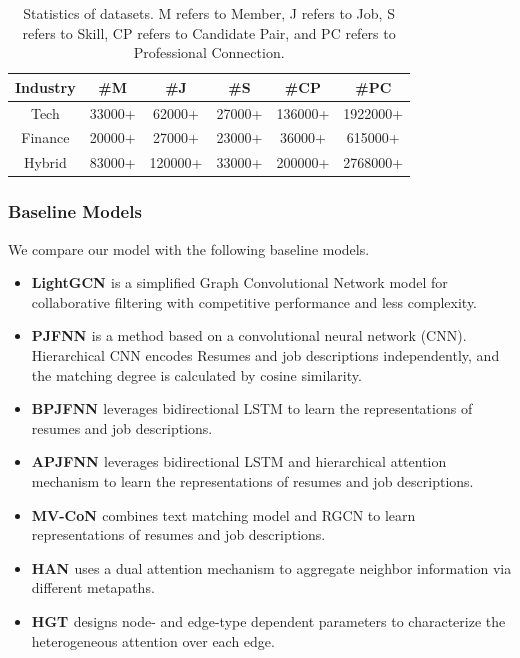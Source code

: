 \begin{table}[ht]
  \caption{Statistics of datasets. M refers to Member, J refers to Job, S refers to Skill, CP refers to Candidate Pair, and PC refers to Professional Connection.}
  \label{tab:dataset statistic}
  \begin{tabular}{cccccc}
    \toprule
    \textbf{Industry} & \textbf{\#M} & \textbf{\#J} & \textbf{\#S} & \textbf{\#CP} &\textbf{\#PC}\\
    \midrule
    Tech        &       33000+   &       62000+ &  27000+ &   136000+  &   1922000+       \\
    Finance     &       20000+   &       27000+    & 23000+ & 36000+  &   615000+       \\
    Hybrid         &       83000+   &       120000+  & 33000+  &   200000+  &   2768000+       \\
    \bottomrule
  \end{tabular}
\end{table}


\subsubsection{Baseline Models}

We compare our model with the following baseline models.

\begin{itemize}
    \item \textbf{LightGCN \cite{he2020lightgcn}} is a simplified Graph Convolutional Network model for collaborative filtering with competitive performance and less complexity.
    \item \textbf{PJFNN \cite{zhu2018person}} is a method based on a convolutional neural network (CNN). Hierarchical CNN encodes Resumes and job descriptions independently, and the matching degree is calculated by cosine similarity.
    \item \textbf{BPJFNN \cite{qin2018enhancing}} leverages bidirectional LSTM to learn the representations of resumes and job descriptions. 
    \item \textbf{APJFNN \cite{qin2018enhancing}} leverages bidirectional LSTM and hierarchical attention mechanism to learn the representations of resumes and job descriptions.
    \item \textbf{MV-CoN \cite{bian2020learning}} combines text matching model and RGCN to learn representations of resumes and job descriptions.
    \item \textbf{HAN \cite{wang2019heterogeneous}} uses a dual attention mechanism to aggregate neighbor information via different metapaths.
    \item \textbf{HGT \cite{hu2020heterogeneous}} designs node- and edge-type dependent parameters to characterize the heterogeneous attention over each edge.
\end{itemize}



